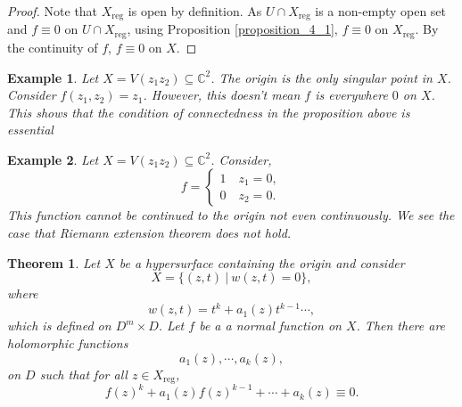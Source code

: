 \documentclass{article}
\newtheorem{theorem}{Theorem} [section]
\newtheorem{example}{Example}[section]
\DeclareMathOperator{\reg}{reg}
\newcommand{\C}[0]{\mathbb{C}}
\newcommand{\sep}[0]{\:|\:}
\begin{document}
\begin{proof}
  Note that $X_{\reg}$ is open by definition. As $U\cap X_{\reg}$ is a non-empty open set and $f\equiv 0$ on $U\cap X_{\reg}$, using Proposition \ref{proposition_4_1}, $f\equiv 0$ on $X_{\reg}$. By the continuity of $f$, $f\equiv 0$ on $X$.
\end{proof}

\begin{example}
  Let $X = V(z_1z_2)\subseteq \C^2$. The origin is the only singular point in $X$. Consider $f(z_1,z_2) = z_1$. However, this doesn't mean $f$ is everywhere $0$ on $X$. 
  This shows that the condition of connectedness in the proposition above is essential
\end{example}

\begin{example}
  Let $X=V(z_1z_2)\subseteq\C^2$. Consider,
  \begin{equation*}
    f = \begin{cases}
      1 \quad z_1=0,\\
      0 \quad z_2 = 0.
    \end{cases}
  \end{equation*}
  This function cannot be continued to the origin not even continuously. We see the case that Riemann extension theorem does not hold.
\end{example}

\begin{theorem}
  \label{theorem_4_3}
  Let $X$ be a hypersurface containing the origin and consider 
  \begin{equation*}
    X = \{(z,t)\sep w(z,t)=0\},
  \end{equation*}
  where 
  \begin{equation*}
    w(z,t) = t^k+a_1(z)t^{k-1}\cdots,
  \end{equation*}
  which is defined on $D^m\times D$. Let $f$ be a a normal function on $X$. Then there are holomorphic functions 
  \begin{equation*}
    a_1(z),\cdots,a_k(z),
  \end{equation*}
  on $D$ such that for all $z\in X_{\reg}$,
  \begin{equation*}
    f(z)^k+a_1(z)f(z)^{k-1}+\cdots+a_k(z) \equiv 0.
  \end{equation*}
\end{theorem}
\end{document}
